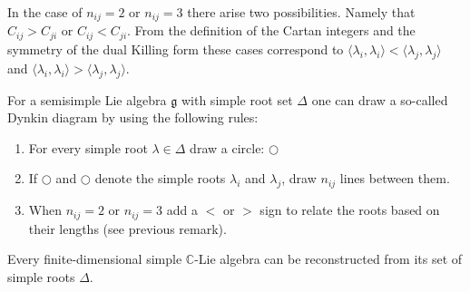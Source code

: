         \begin{remark}
        	In the case of $n_{ij} = 2$ or $n_{ij} = 3$ there arise two possibilities. Namely that $C_{ij}>C_{ji}$ or $C_{ij}<C_{ji}$. From the definition of the Cartan integers and the symmetry of the dual Killing form these cases correspond to $\langle\lambda_i, \lambda_i\rangle<\langle\lambda_j, \lambda_j\rangle$ and $\langle\lambda_i, \lambda_i\rangle>\langle\lambda_j, \lambda_j\rangle$.
        \end{remark}
        
        \begin{construct}\label{lie:construct_dynkin}
        	For a semisimple Lie algebra $\mathfrak{g}$ with simple root set $\Delta$ one can draw a so-called Dynkin diagram by using the following rules:
        	\begin{enumerate}
        		\item For every simple root $\lambda\in\Delta$ draw a circle: $\bigcirc$
        		\item If $\bigcirc$ and $\bigcirc$ denote the simple roots $\lambda_i$ and $\lambda_j$, draw $n_{ij}$ lines between them.
        		\item When $n_{ij} = 2$ or $n_{ij} = 3$ add a $<$ or $>$ sign to relate the roots based on their lengths (see previous remark).
        	\end{enumerate}
        \end{construct}
        
        \begin{theorem}
        	Every finite-dimensional simple $\mathbb{C}$-Lie algebra can be reconstructed from its set of simple roots $\Delta$.
        \end{theorem}
        
